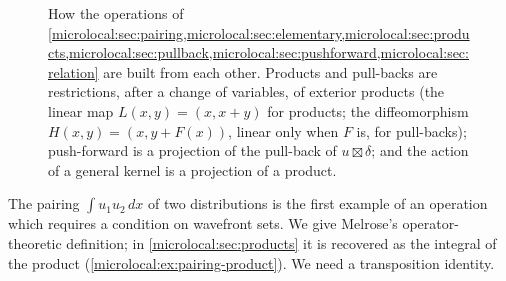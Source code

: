 \begin{figure}[htbp]
\centering
{}
\caption[The calculus of wavefront sets]{How the operations of
\cref{microlocal:sec:pairing,microlocal:sec:elementary,microlocal:sec:products,microlocal:sec:pullback,microlocal:sec:pushforward,microlocal:sec:relation}
are built from each other. Products and pull-backs are restrictions, after a
change of variables, of exterior products (the linear map
$L(x,y)=(x,x+y)$ for products; the diffeomorphism $H(x,y)=(x,y+F(x))$,
linear only when $F$ is, for pull-backs); push-forward is a
projection of the pull-back of $u\boxtimes\delta$; and the action of a
general kernel is a projection of a product.}
\label{microlocal:fig:operations}
\end{figure}

The pairing $\int u_1u_2\,dx$ of two distributions is the first example of an
operation which requires a condition on wavefront sets. We give Melrose's
operator-theoretic definition; in \cref{microlocal:sec:products} it is
recovered as the integral of the product (\cref{microlocal:ex:pairing-product}).
We need a transposition identity.

